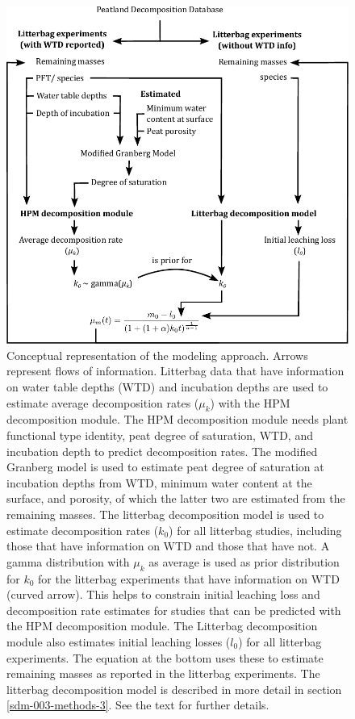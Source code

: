 \documentclass[esd, manuscript]{copernicus}
\begin{document}
\clearpage



\begin{figure}[H]

{\centering \includegraphics[width=0.8\linewidth]{figures/eb1125_hpm_decoposition_conceptual} 

}

\caption{Conceptual representation of the modeling approach. Arrows represent flows of information. Litterbag data that have information on water table depths (WTD) and incubation depths are used to estimate average decomposition rates (\(\mu_k\)) with the HPM decomposition module. The HPM decomposition module needs plant functional type identity, peat degree of saturation, WTD, and incubation depth to predict decomposition rates. The modified Granberg model is used to estimate peat degree of saturation at incubation depths from WTD, minimum water content at the surface, and porosity, of which the latter two are estimated from the remaining masses. The litterbag decomposition model is used to estimate decomposition rates (\(k_0\)) for all litterbag studies, including those that have information on WTD and those that have not. A gamma distribution with \(\mu_k\) as average is used as prior distribution for \(k_0\) for the litterbag experiments that have information on WTD (curved arrow). This helps to constrain initial leaching loss and decomposition rate estimates for studies that can be predicted with the HPM decomposition module. The Litterbag decomposition module also estimates initial leaching losses (\(l_0\)) for all litterbag experiments. The equation at the bottom uses these to estimate remaining masses as reported in the litterbag experiments. The litterbag decomposition model is described in more detail in section \ref{sdm-003-methods-3}. See the text for further details.}\label{fig:hpmd-m-conceptual}
\end{figure}
\end{document}
